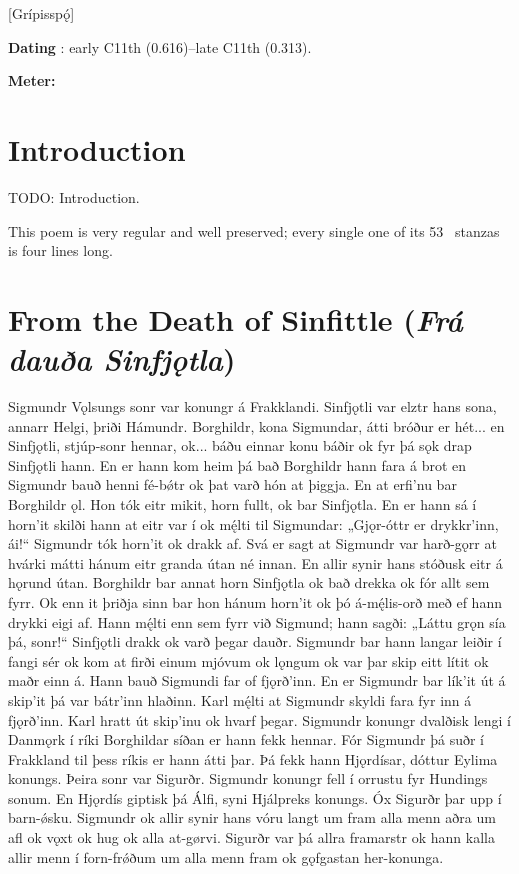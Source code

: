 [Grípisspǫ́]
\def\thisBookCode{Gripisspa}

\begin{flushright}%
\textbf{Dating} \parencite{Sapp2022}: early C11th (0.616)–late C11th (0.313).

\textbf{Meter:} \Fornyrdislag%
\end{flushright}

\section{Introduction}

TODO: Introduction.

This poem is very regular and well preserved; every single one of its 53 \Fornyrdislag\ stanzas is four lines long.

\section{From the Death of Sinfittle (\emph{Frá dauða Sinfjǫtla})}

\sectionline

\bpg\bpa Sigmundr Vǫlsungs sonr var konungr á Frakklandi. Sinfjǫtli var elztr hans sona, annarr Helgi, þriði Hámundr. Borghildr, kona Sigmundar, átti bróður er hét... en Sinfjǫtli, stjúp-sonr hennar, ok... báðu einnar konu báðir ok fyr þá sǫk drap Sinfjǫtli hann. En er hann kom heim þá bað Borghildr hann fara á brot en Sigmundr bauð henni fé-bǿtr ok þat varð hón at þiggja. En at erfi’nu bar Borghildr ǫl. Hon tók eitr mikit, horn fullt, ok bar Sinfjǫtla.  En er hann sá í horn’it skilði hann at eitr var í ok mę́lti til Sigmundar: „Gjǫr-óttr er drykkr’inn, ái!“  Sigmundr tók horn’it ok drakk af.  Svá er sagt at Sigmundr var harð-gǫrr at hvárki mátti hánum eitr granda útan né innan.  En allir synir hans stóðusk eitr á hǫrund útan.  Borghildr bar annat horn Sinfjǫtla ok bað drekka ok fór allt sem fyrr.  Ok enn it þriðja sinn bar hon hánum horn’it ok þó á-mę́lis-orð með ef hann drykki eigi af.  Hann mę́lti enn sem fyrr við Sigmund; hann sagði: „Láttu grǫn sía þá, sonr!“  Sinfjǫtli drakk ok varð þegar dauðr.  Sigmundr bar hann langar leiðir í fangi sér ok kom at firði einum mjóvum ok lǫngum ok var þar skip eitt lítit ok maðr einn á.  Hann bauð Sigmundi far of fjǫrð’inn.  En er Sigmundr bar lík’it út á skip’it þá var bátr’inn hlaðinn.  Karl mę́lti at Sigmundr skyldi fara fyr inn á fjǫrð’inn.  Karl hratt út skip’inu ok hvarf þegar.  Sigmundr konungr dvalðisk lengi í Danmǫrk í ríki Borghildar síðan er hann fekk hennar.  Fór Sigmundr þá suðr í Frakkland til þess ríkis er hann átti þar.  Þá fekk hann Hjǫrdísar, dóttur Eylima konungs.  Þeira sonr var Sigurðr.  Sigmundr konungr fell í orrustu fyr Hundings sonum.  En Hjǫrdís giptisk þá Álfi, syni Hjálpreks konungs.  Óx Sigurðr þar upp í barn-ǿsku.  Sigmundr ok allir synir hans vóru langt um fram alla menn aðra um afl ok vǫxt ok hug ok alla at-gørvi.  Sigurðr var þá allra framarstr ok hann kalla allir menn í forn-frǿðum um alla menn fram ok gǫfgastan her-konunga.\epa

